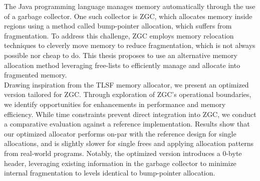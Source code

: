 
The Java programming language manages memory automatically through the use of a garbage collector. One such collector is ZGC, which allocates memory inside regions using a method called bump-pointer allocation, which suffers from fragmentation. To address this challenge, ZGC employs memory relocation techniques to cleverly move memory to reduce fragmentation, which is not always possible nor cheap to do. This thesis proposes to use an alternative memory allocation method leveraging free-lists to efficiently manage and allocate into fragmented memory.\\

Drawing inspiration from the TLSF memory allocator, we present an optimized version tailored for ZGC. Through exploration of ZGC's operational boundaries, we identify opportunities for enhancements in performance and memory efficiency. While time constraints prevent direct integration into ZGC, we conduct a comparative evaluation against a reference implementation. Results show that our optimized allocator performs on-par with the reference design for single allocations, and is slightly slower for single frees and applying allocation patterns from real-world programs. Notably, the optimized version introduces a 0-byte header, leveraging existing information in the garbage collector to minimize internal fragmentation to levels identical to bump-pointer allocation.\\


